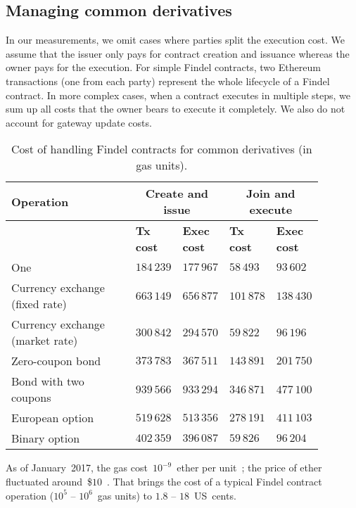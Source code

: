 \subsection{Managing common derivatives}

In our measurements, we omit cases where parties split the execution cost.
We assume that the issuer only pays for contract creation and issuance whereas the owner pays for the execution.
For simple Findel contracts, two Ethereum transactions (one from each party) represent the whole lifecycle of a Findel contract.
In more complex cases, when a contract executes in multiple steps, we sum up all costs that the owner bears to execute it completely.
We also do not account for gateway update costs.

\begin{table}
	\centering
	\begin{tabular}{|p{0.4\linewidth}|p{0.12\linewidth}|p{0.12\linewidth}|p{0.12\linewidth}|p{0.12\linewidth}|}
		\hline
		\textbf{Operation} & \multicolumn{2}{|c|}{\textbf{Create and issue}} & \multicolumn{2}{|c|}{\textbf{Join and execute}}\\
		\hline
		& \textbf{Tx cost} & \textbf{Exec cost} & \textbf{Tx cost} & \textbf{Exec cost} \\
		\hline
		One & $184\,239$ & $177\,967$ & $58\,493$ & $93\,602$ \\
		\hline
		Currency exchange (fixed rate) & $663\,149$ & $656\,877$ & $101\,878$ & $138\,430$ \\
		\hline
		Currency exchange (market rate) & $300\,842$ & $294\,570$ & $59\,822$ & $96\,196$ \\
		\hline
		Zero-coupon bond & $373\,783$ & $367\,511$ & $143\,891$ & $201\,750$ \\
		\hline
		Bond with two coupons & $939\,566$ & $933\,294$ & $346\,871$ & $477\,100$ \\
		\hline
		European option & $519\,628$ & $513\,356$ & $278\,191$ & $411\,103$ \\
		\hline
		Binary option & $402\,359$ & $396\,087$ & $59\,826$ & $96\,204$ \\
		\hline
	\end{tabular}
	\caption{Cost of handling Findel contracts for common derivatives (in gas units).}
	\label{tab:Ch10FindelCost2}
\end{table}

As of January~2017, the gas cost~$10^{-9}$~ether per unit~\cite{Ethstats}; the price of ether fluctuated around~\$$10$~\cite{Worldcoinindex}.
That brings the cost of a typical Findel contract operation ($10^5$ -- $10^6$~gas units) to $1.8$ -- $18$~US~cents.


